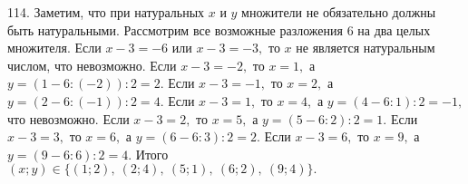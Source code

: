 114. Заметим, что при натуральных $x$ и $y$ множители не обязательно должны быть натуральными. Рассмотрим все возможные разложения 6 на два целых множителя. Если $x-3=-6$ или $x-3=-3,$ то $x$ не является натуральным числом, что невозможно. Если $x-3=-2,$ то $x=1,$ а $y=(1-6:(-2)):2=2.$ Если $x-3=-1,$ то $x=2,$ а $y=(2-6:(-1)):2=4.$ Если $x-3=1,$ то $x=4,$ а $y=(4-6:1):2=-1,$ что невозможно. Если $x-3=2,$ то $x=5,$ а $y=(5-6:2):2=1.$ Если $x-3=3,$ то $x=6,$ а $y=(6-6:3):2=2.$ Если $x-3=6,$ то $x=9,$ а $y=(9-6:6):2=4.$ Итого $(x;y)\in\{(1;2),\ (2;4),\ (5;1),\ (6;2),\ (9;4)\}.$\\
